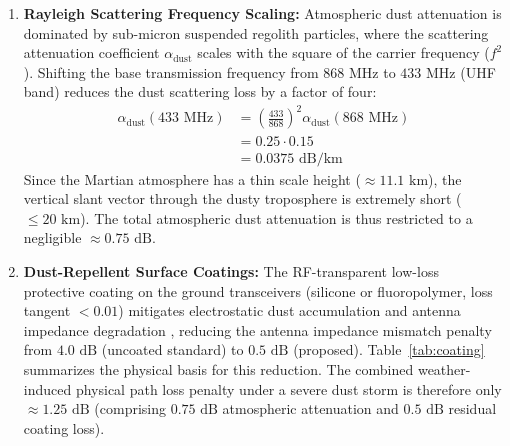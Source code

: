 \documentclass[journal,10pt,doublecolumn]{IEEEtran}
\begin{document}
\begin{enumerate}
    \item \textbf{Rayleigh Scattering Frequency Scaling:} Atmospheric dust attenuation is dominated by sub-micron suspended regolith particles, where the scattering attenuation coefficient $\alpha_{\text{dust}}$ scales with the square of the carrier frequency ($f^2$). Shifting the base transmission frequency from $868\text{ MHz}$ to $433\text{ MHz}$ (UHF band) reduces the dust scattering loss by a factor of four:
    \begin{equation}
    \begin{split}
        \alpha_{\text{dust}}(433\text{ MHz}) &= \left(\frac{433}{868}\right)^2 \alpha_{\text{dust}}(868\text{ MHz}) \\
        &= 0.25 \cdot 0.15 \\
        &= 0.0375\text{ dB/km}
    \end{split}
    \end{equation}
    Since the Martian atmosphere has a thin scale height ($\approx 11.1\text{ km}$), the vertical slant vector through the dusty troposphere is extremely short ($\leq 20\text{ km}$). The total atmospheric dust attenuation is thus restricted to a negligible $\approx 0.75\text{ dB}$.
    \item \textbf{Dust-Repellent Surface Coatings:} The RF-transparent low-loss protective coating on the ground transceivers (silicone or fluoropolymer, loss tangent $< 0.01$) mitigates electrostatic dust accumulation and antenna impedance degradation \cite{calle2011active, afshar2015review}, reducing the antenna impedance mismatch penalty from $4.0\text{ dB}$ (uncoated standard) to $0.5\text{ dB}$ (proposed). Table~\ref{tab:coating} summarizes the physical basis for this reduction. The combined weather-induced physical path loss penalty under a severe dust storm is therefore only $\approx 1.25\text{ dB}$ (comprising $0.75\text{ dB}$ atmospheric attenuation and $0.5\text{ dB}$ residual coating loss).


\end{enumerate}
\end{document}
